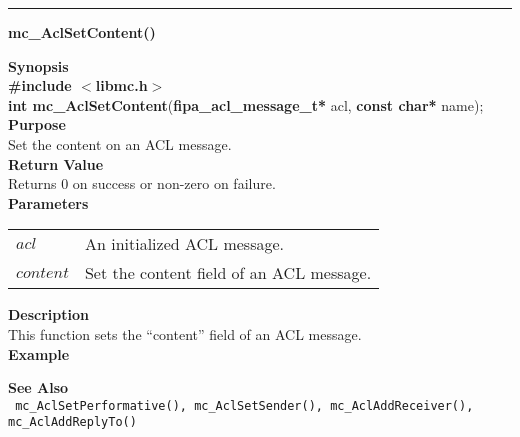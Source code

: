 \noindent
\vspace{5pt}
\rule{6.5in}{0.015in}
\noindent
{}
{\LARGE \bf mc\_AclSetContent()}\\
\label{api:mc_AclSetContent()}

\noindent
{\bf Synopsis}\\
{\bf \#include $<$libmc.h$>$}\\
{\bf int mc\_AclSetContent}({\bf fipa\_acl\_message\_t*} acl, {\bf const char*} name);\\

\noindent
{\bf Purpose}\\
Set the content on an ACL message.\\

\noindent
{\bf Return Value}\\
Returns 0 on success or non-zero on failure.\\

\noindent
{\bf Parameters}
\vspace{-0.1in}
\begin{description}
\item
\begin{tabular}{p{10 mm}p{145 mm}} 
$acl$ & An initialized ACL message. \\
$content$ & Set the content field of an ACL message.
\end{tabular}
\end{description}

\noindent
{\bf Description}\\
This function sets the ``content'' field of an ACL message. \\

\noindent
{\bf Example}\\
\noindent
{\footnotesize }

\noindent
{\bf See Also}\\
\texttt{
  mc\_AclSetPerformative(), mc\_AclSetSender(), mc\_AclAddReceiver(), 
    \linebreak mc\_AclAddReplyTo()
}

